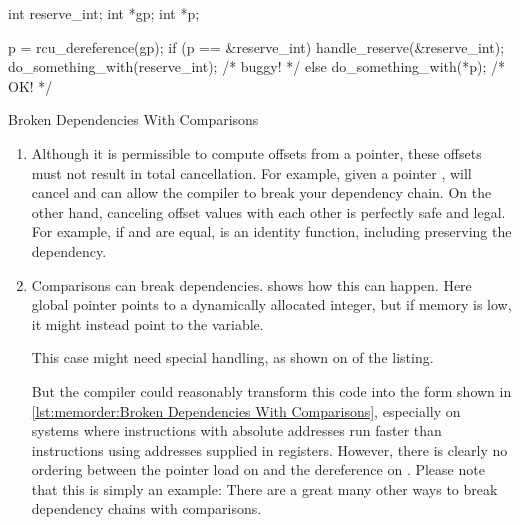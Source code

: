 \begin{listing}
\begin{fcvlabel}
\begin{VerbatimL}[commandchars=\\\[\]]
int reserve_int;
int *gp;
int *p;

p = rcu_dereference(gp);	\lnlbl[deref1]
if (p == &reserve_int) {
	handle_reserve(&reserve_int);
	do_something_with(reserve_int); /* buggy! */ \lnlbl[deref2]
} else {
	do_something_with(*p); /* OK! */
}
\end{VerbatimL}
\end{fcvlabel}
\caption{Broken Dependencies With Comparisons}
\label{lst:memorder:Broken Dependencies With Comparisons}
\end{listing}

\begin{enumerate}
\item	Although it is permissible to compute offsets from a
	pointer, these offsets must not result in total cancellation.
	For example, given a  pointer ,
	 will cancel and can allow the compiler
	to break your dependency chain.
	On the other hand, canceling offset values with each other
	is perfectly safe and legal.
	For example, if  and  are equal, 
	is an identity function, including preserving the dependency.
\item	Comparisons can break dependencies.
	shows how this can happen.
	Here global pointer  points to a dynamically allocated
	integer, but if memory is low, it might instead point to
	the  variable.
	\begin{fcvref}
	This  case might need special handling, as
	shown on  of the listing.
	\end{fcvref}
	\begin{fcvref}
	But the compiler could reasonably transform this code into
	the form shown in
	\cref{lst:memorder:Broken Dependencies With Comparisons},
	especially on systems where instructions with absolute
	addresses run faster than instructions using addresses
	supplied in registers.
	However, there is clearly no ordering between the pointer
	load on  and the dereference on .
	Please note that this is simply an example:
	There are a great many other ways to break dependency chains
	with comparisons.
	\end{fcvref}
\end{enumerate}

